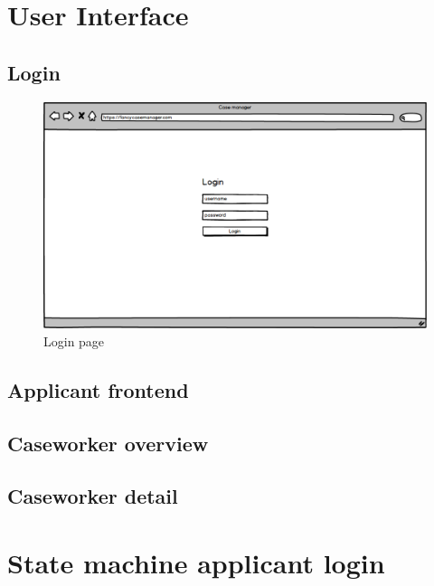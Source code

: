 \newpage
\section{User Interface}

\subsection{Login}

\begin{figure}[htb!]
    \centering
    \includegraphics[width=\textwidth]{img/page-login.png}
    \caption{Login page}
\end{figure}

\subsection{Applicant frontend}

\subsection{Caseworker overview}

\subsection{Caseworker detail}

\section{State machine applicant login}